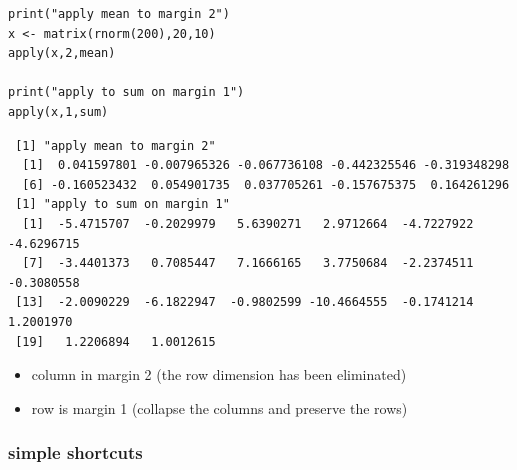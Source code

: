 \documentclass[11pt]{article}
\begin{document}
\begin{verbatim}
print("apply mean to margin 2")
x <- matrix(rnorm(200),20,10)
apply(x,2,mean)

print("apply to sum on margin 1")
apply(x,1,sum)
\end{verbatim}

\begin{verbatim}
 [1] "apply mean to margin 2"
  [1]  0.041597801 -0.007965326 -0.067736108 -0.442325546 -0.319348298
  [6] -0.160523432  0.054901735  0.037705261 -0.157675375  0.164261296
 [1] "apply to sum on margin 1"
  [1]  -5.4715707  -0.2029979   5.6390271   2.9712664  -4.7227922  -4.6296715
  [7]  -3.4401373   0.7085447   7.1666165   3.7750684  -2.2374511  -0.3080558
 [13]  -2.0090229  -6.1822947  -0.9802599 -10.4664555  -0.1741214   1.2001970
 [19]   1.2206894   1.0012615
\end{verbatim}

\begin{itemize}
\item column in margin 2 (the row dimension has been eliminated)
\item row is margin 1 (collapse the columns and preserve the rows)
\end{itemize}
\subsubsection{simple shortcuts}
\label{sec-2-4-4}
\end{document}
